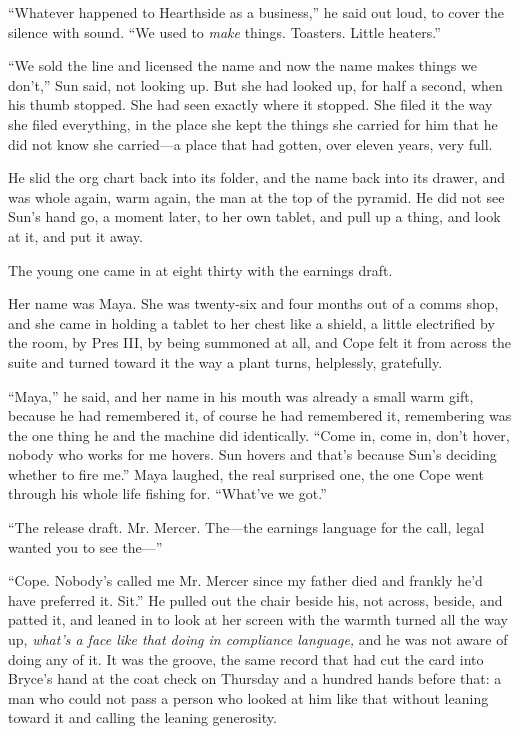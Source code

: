 \documentclass[11pt,openany]{book}
\newcommand{\scenebreak}{\par\vspace{0.5\baselineskip}\begin{center}\textasteriskcentered\quad\textasteriskcentered\quad\textasteriskcentered\end{center}\vspace{0.5\baselineskip}\par}
\begin{document}
``Whatever happened to Hearthside as a business,'' he said out loud, to cover the silence with sound. ``We used to \textit{make} things. Toasters. Little heaters.''

``We sold the line and licensed the name and now the name makes things we don't,'' Sun said, not looking up. But she had looked up, for half a second, when his thumb stopped. She had seen exactly where it stopped. She filed it the way she filed everything, in the place she kept the things she carried for him that he did not know she carried---a place that had gotten, over eleven years, very full.

He slid the org chart back into its folder, and the name back into its drawer, and was whole again, warm again, the man at the top of the pyramid. He did not see Sun's hand go, a moment later, to her own tablet, and pull up a thing, and look at it, and put it away.


\scenebreak


The young one came in at eight thirty with the earnings draft.

Her name was Maya. She was twenty-six and four months out of a comms shop, and she came in holding a tablet to her chest like a shield, a little electrified by the room, by Pres III, by being summoned at all, and Cope felt it from across the suite and turned toward it the way a plant turns, helplessly, gratefully.

``Maya,'' he said, and her name in his mouth was already a small warm gift, because he had remembered it, of course he had remembered it, remembering was the one thing he and the machine did identically. ``Come in, come in, don't hover, nobody who works for me hovers. Sun hovers and that's because Sun's deciding whether to fire me.'' Maya laughed, the real surprised one, the one Cope went through his whole life fishing for. ``What've we got.''

``The release draft. Mr. Mercer. The---the earnings language for the call, legal wanted you to see the---''

``Cope. Nobody's called me Mr. Mercer since my father died and frankly he'd have preferred it. Sit.'' He pulled out the chair beside his, not across, beside, and patted it, and leaned in to look at her screen with the warmth turned all the way up, \textit{what's a face like that doing in compliance language,} and he was not aware of doing any of it. It was the groove, the same record that had cut the card into Bryce's hand at the coat check on Thursday and a hundred hands before that: a man who could not pass a person who looked at him like that without leaning toward it and calling the leaning generosity.
\end{document}
